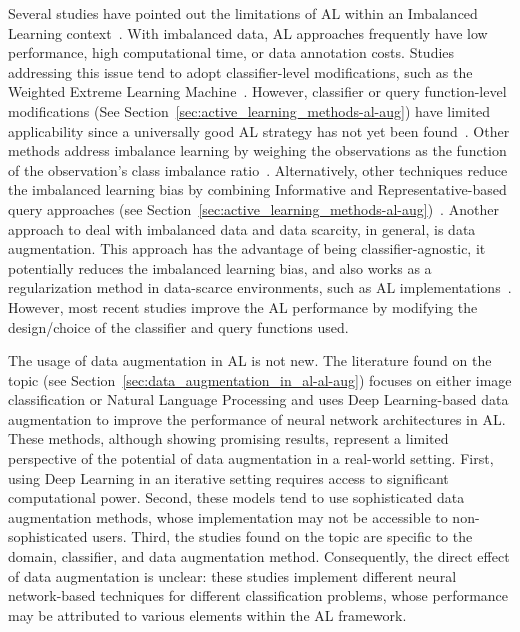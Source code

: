Several studies have pointed out the limitations of AL within an Imbalanced
Learning context~\cite{Yu2019}. With imbalanced data, AL approaches frequently
have low performance, high computational time, or data annotation
costs.  Studies addressing this issue tend to adopt classifier-level
modifications, such as the Weighted Extreme Learning Machine~\cite{Yu2019,
Zong2013, Qin2021}. However, classifier or query function-level modifications
(See Section~\ref{sec:active_learning_methods-al-aug}) have limited applicability
since a universally good AL strategy has not yet been found~\cite{Sener2018}.
Other methods address imbalance learning by weighing the observations as
the function of the observation's class imbalance
ratio~\cite{Liu2021comprehensive}.
Alternatively, other techniques reduce the imbalanced learning bias by
combining Informative and Representative-based query approaches (see
Section~\ref{sec:active_learning_methods-al-aug})~\cite{Tharwat2020}. Another
approach to deal with imbalanced data and data scarcity, in general, is data
augmentation. This approach has the advantage of being classifier-agnostic, it potentially reduces the imbalanced learning
bias, and also works as a regularization method in data-scarce
environments, such as AL implementations~\cite{Kim2021}. However, most recent
studies improve the AL performance by modifying the design/choice of
the classifier and query functions used.
 
The usage of data augmentation in AL is not new. The literature found on the
topic (see Section~\ref{sec:data_augmentation_in_al-al-aug}) focuses on either image
classification or Natural Language Processing and uses Deep Learning-based
data augmentation to improve the performance of neural network architectures
in AL\@. These methods, although showing promising results, represent a
limited perspective of the potential of data augmentation in a real-world
setting. First, using Deep Learning in an iterative setting requires access to significant computational power. Second, these models tend
to use sophisticated data augmentation methods, whose implementation may
not be accessible to non-sophisticated users. Third, the studies found on
the topic are specific to the domain, classifier, and data augmentation
method.  Consequently, the direct effect of data augmentation is unclear:
these studies implement different neural network-based techniques for
different classification problems, whose performance may be attributed to
various elements within the AL framework.

